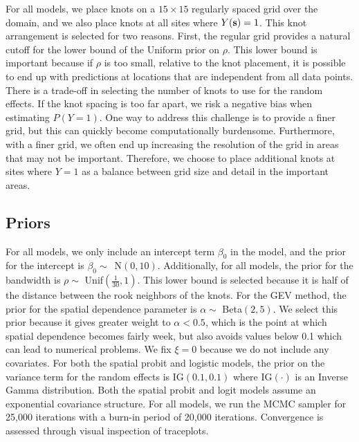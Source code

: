 \documentclass[11pt]{article}
\begin{document}
For all models, we place knots on a $15 \times 15$ regularly spaced grid over the domain, and we also place knots at all sites where $Y(\mbox{\bf s}) = 1$.
This knot arrangement is selected for two reasons.
First, the regular grid provides a natural cutoff for the lower bound of the Uniform prior on $\rho$.
This lower bound is important because if $\rho$ is too small, relative to the knot placement, it is possible to end up with predictions at locations that are independent from all data points.
There is a trade-off in selecting the number of knots to use for the random effects.
If the knot spacing is too far apart, we risk a negative bias when estimating $P(Y = 1)$.
One way to address this challenge is to provide a finer grid, but this can quickly become computationally burdensome.
Furthermore, with a finer grid, we often end up increasing the resolution of the grid in areas that may not be important.
Therefore, we choose to place additional knots at sites where $Y = 1$ as a balance between grid size and detail in the important areas.

\subsection{Priors} \label{rbs:simpriors}
For all models, we only include an intercept term $\beta_0$ in the model, and the prior for the intercept is \mbox{$\beta_0 \sim$ N$(0, 10)$}.
Additionally, for all models, the prior for the bandwidth is $\rho \sim$ Unif$\left(\frac{1}{30}, 1\right)$.
This lower bound is selected because it is half of the distance between the rook neighbors of the knots.
For the GEV method, the prior for the spatial dependence parameter is $\alpha \sim$ Beta$(2, 5)$.
We select this prior because it gives greater weight to $\alpha < 0.5$, which is the point at which spatial dependence becomes fairly week, but also avoids values below 0.1 which can lead to numerical problems.
We fix $\xi = 0$ because we do not include any covariates.
For both the spatial probit and logistic models, the prior on the variance term for the random effects is IG$(0.1, 0.1)$ where IG$(\cdot)$ is an Inverse Gamma distribution.
Both the spatial probit and logit models assume an exponential covariance structure. For all models, we run the MCMC sampler for 25,000 iterations with a burn-in period of 20,000 iterations.
Convergence is assessed through visual inspection of traceplots.
\end{document}
